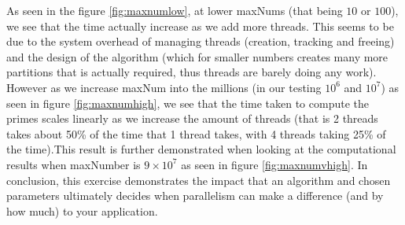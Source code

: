 As seen in the figure \ref{fig:maxnumlow}, at lower maxNums 
(that being $10$ or $100$), we see that the 
time actually increase as we add more threads. This seems to be due to the 
system overhead of managing threads (creation, tracking and freeing) and the 
design of the algorithm (which for smaller numbers creates many more partitions
that is actually required, thus threads are barely doing any work). However as 
we increase maxNum into the millions (in our testing $10^6$ and $10^7$) as seen 
in figure \ref{fig:maxnumhigh}, 
we see that the time taken to compute the primes scales linearly as we increase 
the amount of threads (that is 2 threads takes about 50\% of the time that 1 
thread takes, with 4 threads taking 25\% of the time).This result is further 
demonstrated when looking at the computational results when maxNumber is 
$9\times10^7$ as seen in figure \ref{fig:maxnumvhigh}. In conclusion, this exercise demonstrates the impact that an algorithm 
and chosen parameters ultimately decides when parallelism can make a difference 
(and by how much) to your application.



